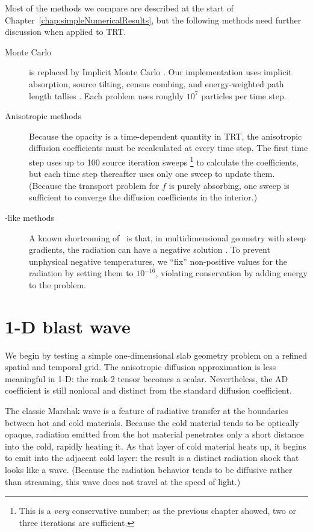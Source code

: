 Most of the methods we compare are described at the start of
Chapter~\ref{chap:simpleNumericalResults}, but the following methods need
further discussion when applied to TRT.
\begin{description}

  \item[Monte Carlo] is replaced by Implicit Monte Carlo \cite{Fle1971}. Our
    implementation uses implicit absorption, source tilting, census combing, and
    energy-weighted path length tallies \cite{Urb2006}. Each problem uses
    roughly $10^7$ particles per time step.

  \item[Anisotropic methods] Because the opacity is a time-dependent quantity
in TRT, the anisotropic diffusion coefficients must be recalculated at every
time step. The first time step uses up to 100 source iteration sweeps%
\footnote{%
  This is a \emph{very} conservative number; as the previous chapter showed,
  two or three iterations are sufficient.
} to
calculate the coefficients, but each time step thereafter uses only one sweep to
update them. (Because the transport problem for $f$ is purely absorbing, one
sweep is sufficient to converge the diffusion coefficients in the interior.)

  \item[\Pone-like methods] A known shortcoming of \Pone\ is that, in
    multidimensional geometry with steep gradients, the radiation can have a
    negative solution \cite{McC2008a}. To prevent unphysical negative
    temperatures, we
    ``fix'' non-positive values for the radiation by setting them
    to $10^{-16}$, violating conservation by adding energy to the problem.

\end{description}

\section{1-D blast wave}\label{sec:trtOned}
We begin by testing a simple one-dimensional slab geometry problem on a refined
spatial and temporal grid. The anisotropic diffusion approximation is less
meaningful in 1-D: the rank-2 tensor becomes a scalar. Nevertheless, the AD
coefficient is still nonlocal and distinct from the standard diffusion
coefficient.

The classic Marshak wave \cite{Mar1958} is a feature of radiative transfer at
the boundaries between hot and cold materials. Because the cold material tends
to be optically opaque, radiation emitted from the hot material penetrates only
a short distance into the cold, rapidly heating it. As that layer of cold
material heats up, it begins to emit into the adjacent cold layer: the result
is a distinct radiation shock that looks like a wave. (Because the radiation
behavior tends to be diffusive rather than streaming, this wave does not
travel at the speed of light.)


